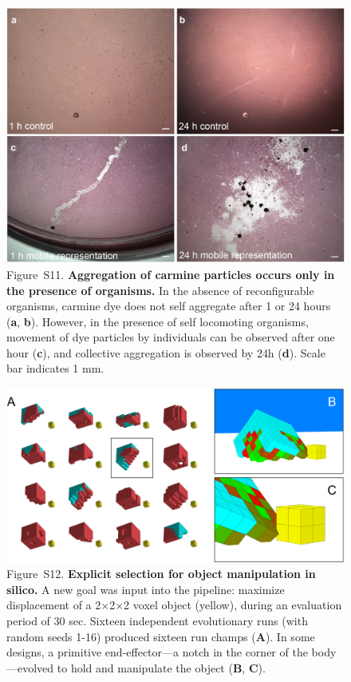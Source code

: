 \begin{figure}[t]
\centering
\includegraphics[width=\linewidth]{Chapter07/img/dye control.png}
\caption*{Figure~S11.  \textbf{Aggregation of carmine particles occurs only in the presence of organisms.} 
In the absence of reconfigurable organisms, carmine dye does not self aggregate after 1 or 24 hours (\textbf{a}, \textbf{b}). 
However, in the presence of self locomoting organisms, movement of dye particles by individuals can be observed after one hour (\textbf{c}), and collective aggregation is observed by 24h (\textbf{d}). 
Scale bar indicates 1 mm.
}
\end{figure}

\begin{figure}[t]
\centering
\includegraphics[width=\linewidth]{Chapter07/img/SupplementalObjectManipulation.png}
\caption*{Figure~S12.  \textbf{Explicit selection for object manipulation in silico.} 
A new goal was input into the pipeline: maximize displacement of a 2{$\times$}2{$\times$}2 voxel object (yellow), during an evaluation period of 30 sec. 
Sixteen independent evolutionary runs (with random seeds 1-16) produced sixteen run champs (\textbf{A}). 
In some designs, a primitive end-effector---a notch in the corner of the body---evolved to hold and manipulate the object (\textbf{B}, \textbf{C}). 
}
\end{figure}



